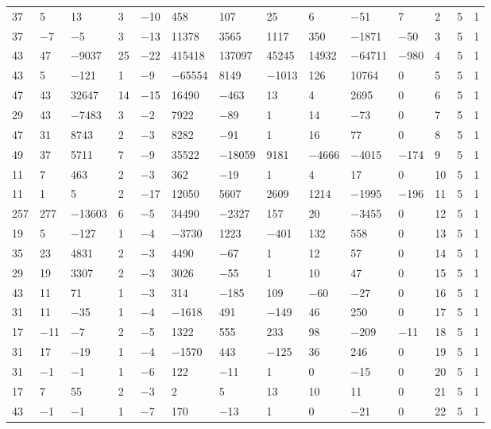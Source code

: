 \documentclass[pdftex]{sigma}
\numberwithin{equation}{section}
\theoremstyle{definition}
\numberwithin{table}{section}
\begin{document}
{\begin{paracol}{3}
\begin{supertabular}{|w{c}{.32cm}w{c}{.32cm}w{c}{.32cm}@{\hspace{.5cm}}w{c}{.2cm}w{c}{.2cm}|@{\hspace{\tabcolsep}}HHHHHHw{c}{.17cm}w{c}{.17cm}w{c}{.17cm}|}
			37 & 5 & 13 & 3 & $-$10 & 458 & 107 & 25 & 6 & $-$51 & 7 & 2 & 5 & 1 \\
			37 & $-$7 & $-$5 & 3 & $-$13 & 11378 & 3565 & 1117 & 350 & $-$1871 & $-$50 & 3 & 5 & 1 \\
			43 & 47 & $-$9037 & 25 & $-$22 & 415418 & 137097 & 45245 & 14932 & $-$64711 & $-$980 & 4 & 5 & 1 \\
			43 & 5 & $-$121 & 1 & $-$9 & $-$65554 & 8149 & $-$1013 & 126 & 10764 & 0 & 5 & 5 & 1 \\
			47 & 43 & 32647 & 14 & $-$15 & 16490 & $-$463 & 13 & 4 & 2695 & 0 & 6 & 5 & 1 \\
			29 & 43 & $-$7483 & 3 & $-$2 & 7922 & $-$89 & 1 & 14 & $-$73 & 0 & 7 & 5 & 1 \\
			47 & 31 & 8743 & 2 & $-$3 & 8282 & $-$91 & 1 & 16 & 77 & 0 & 8 & 5 & 1 \\
			49 & 37 & 5711 & 7 & $-$9 & 35522 & $-$18059 & 9181 & $-$4666 & $-$4015 & $-$174 & 9 & 5 & 1 \\
			11 & 7 & 463 & 2 & $-$3 & 362 & $-$19 & 1 & 4 & 17 & 0 & 10 & 5 & 1 \\
			11 & 1 & 5 & 2 & $-$17 & 12050 & 5607 & 2609 & 1214 & $-$1995 & $-$196 & 11 & 5 & 1 \\
			257 & 277 & $-$13603 & 6 & $-$5 & 34490 & $-$2327 & 157 & 20 & $-$3455 & 0 & 12 & 5 & 1 \\
			19 & 5 & $-$127 & 1 & $-$4 & $-$3730 & 1223 & $-$401 & 132 & 558 & 0 & 13 & 5 & 1 \\
			35 & 23 & 4831 & 2 & $-$3 & 4490 & $-$67 & 1 & 12 & 57 & 0 & 14 & 5 & 1 \\
			29 & 19 & 3307 & 2 & $-$3 & 3026 & $-$55 & 1 & 10 & 47 & 0 & 15 & 5 & 1 \\
			43 & 11 & 71 & 1 & $-$3 & 314 & $-$185 & 109 & $-$60 & $-$27 & 0 & 16 & 5 & 1 \\
			31 & 11 & $-$35 & 1 & $-$4 & $-$1618 & 491 & $-$149 & 46 & 250 & 0 & 17 & 5 & 1 \\
			17 & $-$11 & $-$7 & 2 & $-$5 & 1322 & 555 & 233 & 98 & $-$209 & $-$11 & 18 & 5 & 1 \\
			31 & 17 & $-$19 & 1 & $-$4 & $-$1570 & 443 & $-$125 & 36 & 246 & 0 & 19 & 5 & 1 \\
			31 & $-$1 & $-$1 & 1 & $-$6 & 122 & $-$11 & 1 & 0 & $-$15 & 0 & 20 & 5 & 1 \\
			17 & 7 & 55 & 2 & $-$3 & 2 & 5 & 13 & 10 & 11 & 0 & 21 & 5 & 1 \\
			43 & $-$1 & $-$1 & 1 & $-$7 & 170 & $-$13 & 1 & 0 & $-$21 & 0 & 22 & 5 & 1 \\

\end{supertabular}
\end{paracol}}
\end{document}
